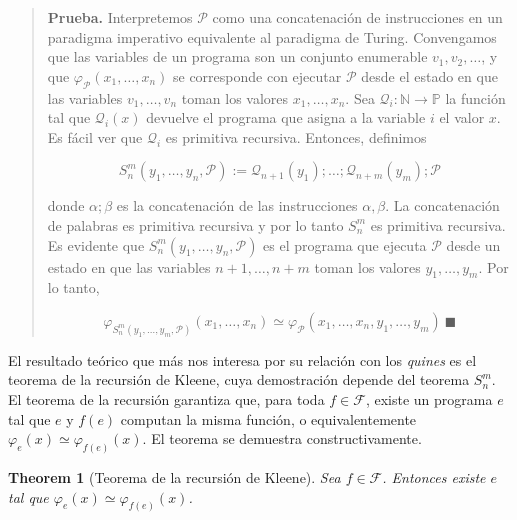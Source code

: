 \documentclass[a4paper, 12pt]{article}
\newtheorem{theorem}{Theorem}
\newtheorem{theorem}{Theorem}
\begin{document}
\small
\begin{quote}

\textbf{Prueba.} Interpretemos $\mathcal{P}$ como una concatenación de
instrucciones en un paradigma imperativo equivalente al paradigma de Turing.
Convengamos que las variables de un programa son un
conjunto enumerable $v_1, v_2, \ldots$, y que
$\varphi_\mathcal{P}(x_1,\ldots, x_n)$ se corresponde con ejecutar $\mathcal{P}$
desde el estado en que las variables $v_1, \ldots, v_n$ toman los valores $x_1,
\ldots, x_n$. Sea
$\mathcal{Q}_i : \mathbb{N} \to \mathbb{P}$ la función tal que
$\mathcal{Q}_i(x)$ devuelve el programa que asigna a la variable $i$ el valor
$x$. Es fácil ver que $\mathcal{Q}_i$ es primitiva recursiva. Entonces,
definimos 

\begin{equation*}
  S_n^m(y_1, \ldots, y_n, \mathcal{P}) := \mathcal{Q}_{n+1}(y_1); \ldots;
  \mathcal{Q}_{n+m} (y_m); \mathcal{P}
\end{equation*}

donde $\alpha;\beta$ es la concatenación de las instrucciones $\alpha, \beta$.
La concatenación de palabras es primitiva recursiva y por lo tanto $S_n^m$ es
primitiva recursiva. Es evidente que $S_n^m(y_1, \ldots, y_n, \mathcal{P})$ es el programa
que ejecuta $\mathcal{P}$ desde un estado en que las variables $n+1, \ldots, n+m$ 
toman los valores $y_1, \ldots, y_m$. Por lo tanto, 

\begin{equation*}
  \varphi_{S_n^m(y_1,\ldots, y_m, \mathcal{P})}(x_1,\ldots, x_n) \simeq
  \varphi_{\mathcal{P}}(x_1, \ldots, x_n, y_1, \ldots, y_m) ~ \blacksquare
\end{equation*}



\end{quote}
\normalsize


El resultado teórico que más nos interesa por su relación con los \textit{quines}
es el teorema de la recursión de Kleene, cuya demostración depende del teorema
$S_n^m$. El teorema de la recursión garantiza que, para toda
$f \in \mathcal{F}$, existe un programa $e$ tal que $e$ y $f(e)$ computan la
misma función, o equivalentemente $\varphi_e(x) \simeq \varphi_{f(e)}(x)$. El
teorema se demuestra constructivamente. 

\begin{theorem}[Teorema de la recursión de Kleene]
  Sea $f \in \mathcal{F}$. Entonces existe $e$ tal que $\varphi_e(x) \simeq
  \varphi_{f(e)}(x)$.
\end{theorem}
\end{document}
